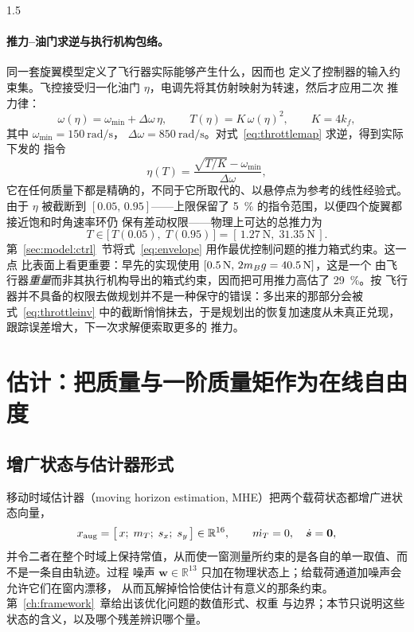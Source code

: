 \begin{spacing}{1.5}
\paragraph{推力--油门求逆与执行机构包络。}同一套旋翼模型定义了飞行器实际能够产生什么，因而也
定义了控制器的输入约束集。飞控接受归一化油门 $\eta$，电调先将其仿射映射为转速，然后才应用二次
推力律：
\begin{equation}
\omega(\eta) = \omega_{\min} + \Delta\omega\,\eta,
\qquad
T(\eta) = K\,\omega(\eta)^2,
\qquad K = 4k_f ,
\label{eq:throttlemap}
\end{equation}
其中 $\omega_{\min}=\SI{150}{\radian\per\second}$，
$\Delta\omega=\SI{850}{\radian\per\second}$。对式~\eqref{eq:throttlemap} 求逆，得到实际下发的
指令
\begin{equation}
\eta(T) = \frac{\sqrt{T/K}-\omega_{\min}}{\Delta\omega},
\label{eq:throttleinv}
\end{equation}
它在任何质量下都是精确的，不同于它所取代的、以悬停点为参考的线性经验式。由于 $\eta$ 被截断到
$[0.05,\,0.95]$——上限保留了 \SI{5}{\percent} 的指令范围，以便四个旋翼都接近饱和时角速率环仍
保有差动权限——物理上可达的总推力为
\begin{equation}
T \in \bigl[\,T(0.05),\; T(0.95)\,\bigr] = [\,\SI{1.27}{\newton},\; \SI{31.35}{\newton}\,].
\label{eq:envelope}
\end{equation}
第~\ref{sec:model:ctrl}~节将式~\eqref{eq:envelope} 用作最优控制问题的推力箱式约束。这一点
比表面上看更重要：早先的实现使用 $[\SI{0.5}{\newton},\,2m_B g=\SI{40.5}{\newton}]$，这是一个
由飞行器\emph{重量}而非其执行机构导出的箱式约束，因而把可用推力高估了 \SI{29}{\percent}。按
飞行器并不具备的权限去做规划并不是一种保守的错误：多出来的那部分会被式~\eqref{eq:throttleinv}
中的截断悄悄抹去，于是规划出的恢复加速度从未真正兑现，跟踪误差增大，下一次求解便索取更多的
推力。

\section{估计：把质量与一阶质量矩作为在线自由度}\label{sec:model:mhe}

\subsection{增广状态与估计器形式}\label{sec:model:mheform}

移动时域估计器（moving horizon estimation, MHE）把两个载荷状态都增广进状态向量，
\begin{equation}
x_{\mathrm{aug}} = \bigl[\,x;\; m_T;\; s_x;\; s_y\,\bigr] \in \mathbb{R}^{16},
\qquad \dot{m_T} = 0, \quad \dot{\bm{s}}=\bm{0},
\label{eq:xaug}
\end{equation}
并令二者在整个时域上保持常值，从而使一窗测量所约束的是各自的单一取值、而不是一条自由轨迹。过程
噪声 $\bm{w} \in \mathbb{R}^{13}$ 只加在物理状态上；给载荷通道加噪声会允许它们在窗内漂移，
从而瓦解掉恰恰使估计有意义的那条约束。第~\ref{ch:framework}~章给出该优化问题的数值形式、权重
与边界；本节只说明这些状态的含义，以及哪个残差辨识哪个量。


\end{spacing}
